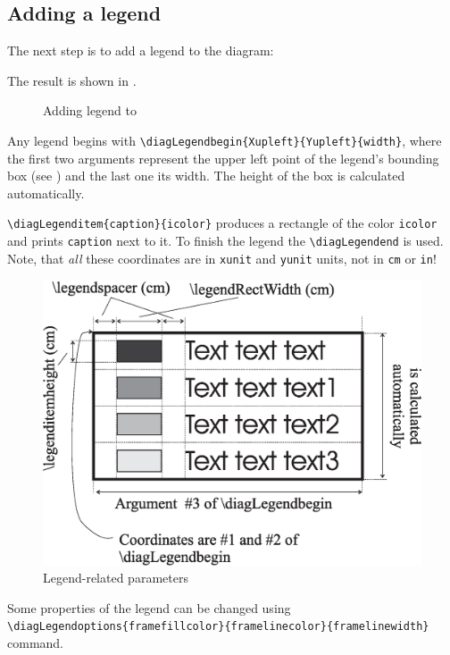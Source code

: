 \documentclass[12pt]{article}
\begin{document}
\subsection{Adding a legend \label{sec:2.2}}
The next step is to add a legend to the diagram: 

The result is shown in .
\begin{figure}[t]\centering
  
\caption{\label{fig:4} Adding legend to }
\end{figure}

Any legend begins with 
\verb+\diagLegendbegin{Xupleft}{Yupleft}{width}+,
where the first two arguments represent the upper left point of the
legend's bounding box (see ) and the last one its width.
The height of the box is  calculated automatically.

\verb+\diagLegenditem{caption}{icolor}+ produces a rectangle of the
color \texttt{icolor} and prints \texttt{caption} next to it. To finish
the legend the \verb+\diagLegendend+
is used. Note, that \emph{all} these coordinates are in \texttt{xunit}
and \texttt{yunit} units, not in \texttt{cm} or \texttt{in}!
\begin{figure}[t]\centering
  \includegraphics[scale=0.5]{figs/diagleg.eps}
\caption{\label{fig:5} Legend-related parameters}
\end{figure}

Some properties of the legend can be changed using \\
\verb+\diagLegendoptions{framefillcolor}{framelinecolor}{framelinewidth}+
command.
\end{document}
